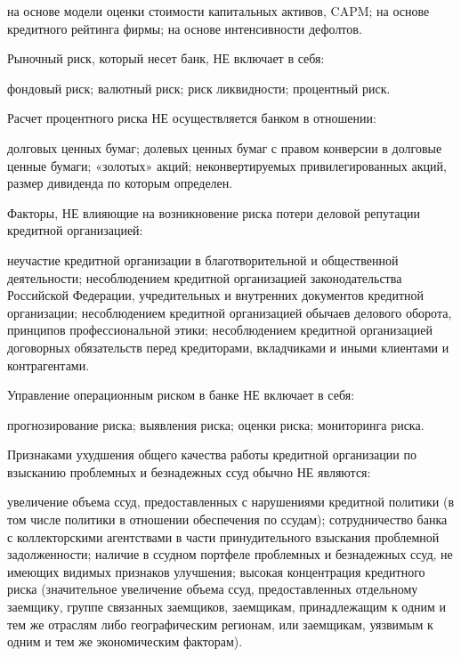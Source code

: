 \documentclass[12pt, table]{exam}
\begin{document}
\begin{questions}
\begin{multicols}{2}
\begin{choices}
	 \CC на основе модели оценки стоимости капитальных активов, CAPM;
	 \choice на основе кредитного рейтинга фирмы;
	 \choice на основе интенсивности дефолтов.
	 \end{choices}
\question Рыночный риск, который несет банк, НЕ включает в себя:
	 \begin{choices}
	 \choice фондовый риск;
	 \choice валютный риск;
	 \CC риск ликвидности;
	 \choice процентный риск.
	 \end{choices}
\question Расчет процентного риска НЕ осуществляется банком в отношении:
	 \begin{choices}
	 \choice долговых ценных бумаг;
	 \choice долевых ценных бумаг с правом конверсии в долговые ценные бумаги;
	 \CC «золотых» акций;
	 \choice неконвертируемых привилегированных акций, размер дивиденда по которым определен.
	 \end{choices}
\question Факторы, НЕ влияющие на возникновение риска потери деловой репутации кредитной организацией:
	 \begin{choices}
	 \CC неучастие кредитной организации в благотворительной и общественной деятельности;
	 \choice несоблюдением кредитной организацией законодательства Российской Федерации, учредительных и внутренних документов кредитной организации;
	 \choice несоблюдением кредитной организацией обычаев делового оборота, принципов профессиональной этики;
	 \choice несоблюдением кредитной организацией договорных обязательств перед кредиторами, вкладчиками и иными клиентами и контрагентами.
	 \end{choices}
\question Управление операционным риском в банке НЕ включает в себя:
	 \begin{choices}
	 \CC прогнозирование риска;
	 \choice выявления риска;
	 \choice оценки риска;
	 \choice мониторинга риска.
	 \end{choices}
\question Признаками ухудшения общего качества работы кредитной организации по взысканию проблемных и безнадежных ссуд обычно НЕ являются:
	 \begin{choices}
	 \choice увеличение объема ссуд, предоставленных с нарушениями кредитной политики (в том числе политики в отношении обеспечения по ссудам);
	 \CC сотрудничество банка с коллекторскими агентствами в части принудительного взыскания проблемной задолженности;
	 \choice наличие в ссудном портфеле проблемных и безнадежных ссуд, не имеющих видимых признаков улучшения;
	 \choice высокая концентрация кредитного риска (значительное увеличение объема ссуд, предоставленных отдельному заемщику, группе связанных заемщиков, заемщикам, принадлежащим к одним и тем же отраслям либо географическим регионам, или заемщикам, уязвимым к одним и тем же экономическим факторам).
	 \end{choices}



\end{multicols}
\end{questions}
\end{document}
